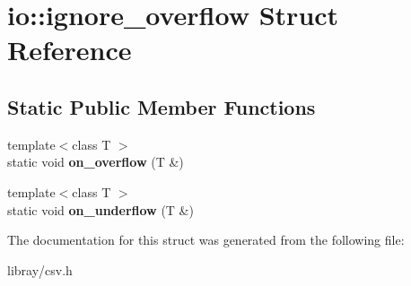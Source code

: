 \hypertarget{structio_1_1ignore__overflow}{}\section{io\+:\+:ignore\+\_\+overflow Struct Reference}
\label{structio_1_1ignore__overflow}
\subsection*{Static Public Member Functions}
\begin{DoxyCompactItemize}
\item 
\mbox{\label{structio_1_1ignore__overflow_aed3e5026cfa7157ea9270ae377d1026b}} 
{\footnotesize template$<$class T $>$ }\\static void {\bfseries on\+\_\+overflow} (T \&)
\item 
\mbox{\label{structio_1_1ignore__overflow_aece692f7a20933149ec99aa1f97458ad}} 
{\footnotesize template$<$class T $>$ }\\static void {\bfseries on\+\_\+underflow} (T \&)
\end{DoxyCompactItemize}


The documentation for this struct was generated from the following file\+:\begin{DoxyCompactItemize}
\item 
libray/csv.\+h\end{DoxyCompactItemize}
